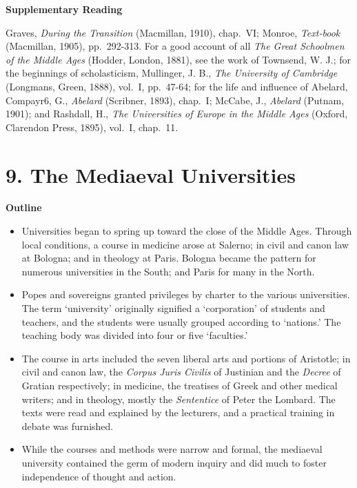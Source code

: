 \documentclass[
]{book}
\providecommand{\tightlist}{%
  \setlength{\itemsep}{0pt}\setlength{\parskip}{0pt}}
\begin{document}
\textbf{Supplementary Reading}

Graves, \emph{During the Transition} (Macmillan, 1910), chap.~VI; Monroe, \emph{Text-book} (Macmillan, 1905), pp.~292-313. For a good account of all \emph{The Great Schoolmen of the Middle Ages} (Hodder, London, 1881), see the work of Townsend, W. J.; for the beginnings of scholasticism, Mullinger, J. B., \emph{The University of Cambridge} (Longmans, Green, 1888), vol.~I, pp.~47-64; for the life and influence of Abelard, Compayr6, G., \emph{Abelard} (Scribner, 1893), chap.~I; McCabe, J., \emph{Abelard} (Putnam, 1901); and Rashdall, H., \emph{The Universities of Europe in the Middle Ages} (Oxford, Clarendon Press, 1895), vol.~I, chap.~11.

\hypertarget{the-mediaeval-universities}{%
\chapter{9. The Mediaeval Universities}\label{the-mediaeval-universities}}

\textbf{Outline}

\begin{itemize}
\tightlist
\item
  Universities began to spring up toward the close of the Middle Ages. Through local conditions, a course in medicine arose at Salerno; in civil and canon law at Bologna; and in theology at Paris. Bologna became the pattern for numerous universities in the South; and Paris for many in the North.
\item
  Popes and sovereigns granted privileges by charter to the various universities. The term `university' originally signified a `corporation' of students and teachers, and the students were usually grouped according to `nations.' The teaching body was divided into four or five `faculties.'
\item
  The course in arts included the seven liberal arts and portions of Aristotle; in civil and canon law, the \emph{Corpus Juris Civilis} of Justinian and the \emph{Decree} of Gratian respectively; in medicine, the treatises of Greek and other medical writers; and in theology, mostly the \emph{Sententice} of Peter the Lombard. The texts were read and explained by the lecturers, and a practical training in debate was furnished.
\item
  While the courses and methods were narrow and formal, the mediaeval university contained the germ of modern inquiry and did much to foster independence of thought and action.
\end{itemize}
\end{document}
